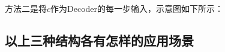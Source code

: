 
方法二是将\(c\)作为Decoder的每一步输入，示意图如下所示：


\subsection{以上三种结构各有怎样的应用场景}\label{ux4ee5ux4e0aux4e09ux79cdux7ed3ux6784ux5404ux6709ux600eux6837ux7684ux5e94ux7528ux573aux666f}

